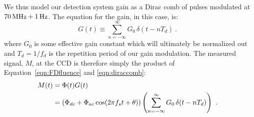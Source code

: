 We thus model our detection system gain as a Dirac comb of pulses modulated at $70\,\rm{MHz} + 1\,\rm{Hz}$. The equation for the gain, in this case, is:
\begin{equation}
\label{eqn:diraccomb}
G(t)\equiv\sum_{n=-\infty}^{\infty} G_0\,\delta(t - nT_d) \ .
\end{equation}
\noindent
where $G_0$ is some effective gain constant which will ultimately be normalized out and $T_d=1/f_d$ is the repetition period of our gain modulation. The measured signal, $M$, at the CCD is therefore simply the product of Equation~\ref{eqn:FDfluence} and \ref{eqn:diraccomb}:
\begin{align}
M(t)
&=\Phi(t)G(t) \notag\\
&=\left(\Phi_{dc} + \Phi_{ac} \cos(2 \pi f_s t+\theta)\right)\left( \sum_{n=-\infty}^{\infty}G_0\,\delta(t-n T_d)\right) \ .
\end{align}

